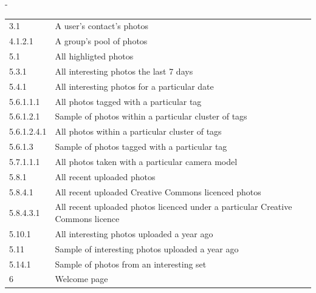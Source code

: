 \begin{table}
\begin{adjustwidth*}{0em}{-\wholemargin}
\begin{center}
\begin{tabular}{ll}
        3.1 &
        A user's contact's photos \\

        4.1.2.1 &
        A group's pool of photos \\

        5.1 &
        All highligted photos \\

        5.3.1 &
        All interesting photos the last 7 days \\

        5.4.1 &
        All interesting photos for a particular date \\

        5.6.1.1.1 &
        All photos tagged with a particular tag \\

        5.6.1.2.1 &
        Sample of  photos within a particular cluster of tags \\

        5.6.1.2.4.1 &
        All photos within a particular cluster of tags \\

        5.6.1.3 &
        Sample of photos tagged with a particular tag \\

        5.7.1.1.1 &
        All photos taken with a particular camera model \\

        5.8.1 &
        All recent uploaded photos \\

        5.8.4.1 &
        All recent uploaded Creative Commons licenced photos \\

        5.8.4.3.1 &
        All recent uploaded photos licenced under a particular Creative
        Commons licence \\

        5.10.1 &
        All interesting photos uploaded a year ago \\

        5.11 &
        Sample of interesting photos uploaded a year ago \\

        5.14.1 &
        Sample of photos from an interesting set \\




        6 &
        Welcome page \\

        \bottomrule

      \end{tabular}
    \end{center}
  \end{adjustwidth*}
\end{table}

